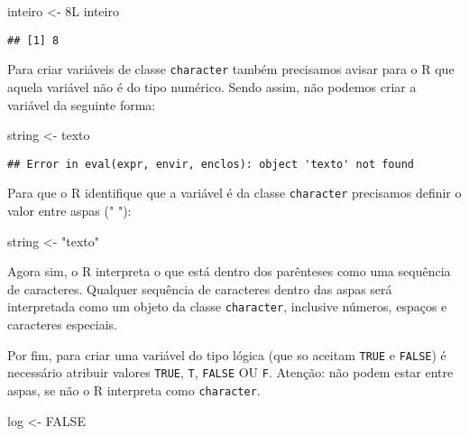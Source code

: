 \documentclass[]{book}
\newenvironment{Shaded}{\begin{snugshade}}{\end{snugshade}}
\newcommand{\NormalTok}[1]{#1}
\newcommand{\OtherTok}[1]{\textcolor[rgb]{0.56,0.35,0.01}{#1}}
\newcommand{\StringTok}[1]{\textcolor[rgb]{0.31,0.60,0.02}{#1}}
\theoremstyle{definition}
\theoremstyle{definition}
\theoremstyle{definition}
\theoremstyle{remark}
\begin{document}
\begin{Shaded}
\begin{Highlighting}[]
\NormalTok{inteiro <-}\StringTok{ }\NormalTok{8L}
\NormalTok{inteiro}
\end{Highlighting}
\end{Shaded}

\begin{verbatim}
## [1] 8
\end{verbatim}

Para criar variáveis de classe \texttt{character} também precisamos avisar para o R que aquela variável não é do tipo numérico. Sendo assim, não podemos criar a variável da seguinte forma:

\begin{Shaded}
\begin{Highlighting}[]
\NormalTok{string <-}\StringTok{ }\NormalTok{texto}
\end{Highlighting}
\end{Shaded}

\begin{verbatim}
## Error in eval(expr, envir, enclos): object 'texto' not found
\end{verbatim}

Para que o R identifique que a variável é da classe \texttt{character} precisamos definir o valor entre aspas (" "):

\begin{Shaded}
\begin{Highlighting}[]
\NormalTok{string <-}\StringTok{ "texto"}
\end{Highlighting}
\end{Shaded}

Agora sim, o R interpreta o que está dentro dos parênteses como uma sequência de caracteres. Qualquer sequência de caracteres dentro das aspas será interpretada como um objeto da classe \texttt{character}, inclusive números, espaços e caracteres especiais.

Por fim, para criar uma variável do tipo lógica (que so aceitam \texttt{TRUE} e \texttt{FALSE}) é necessário atribuir valores \texttt{TRUE}, \texttt{T}, \texttt{FALSE} OU \texttt{F}. Atenção: não podem estar entre aspas, se não o R interpreta como \texttt{character}.

\begin{Shaded}
\begin{Highlighting}[]
\NormalTok{log <-}\StringTok{ }\OtherTok{FALSE}
\end{Highlighting}
\end{Shaded}
\end{document}

